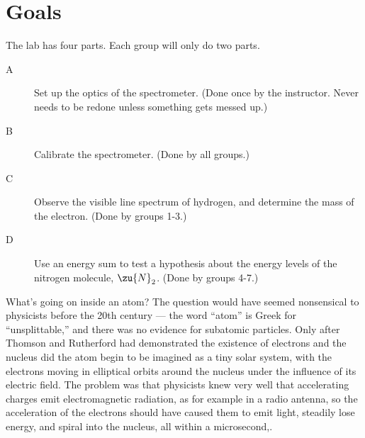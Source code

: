 \label{lab:hydrogen}

\apparatus
{}

\section*{Goals}

The lab has four parts. Each group will only do two parts.

\begin{description}

\item[A] Set up the optics of the spectrometer. (Done once by the instructor. Never needs to be redone unless
           something gets messed up.)

\item[B] Calibrate the spectrometer. (Done by all groups.)

\item[C] Observe the visible line spectrum of hydrogen, and determine the mass of the electron.
             (Done by groups 1-3.)

\item[D] Use an energy sum to test a hypothesis about the energy levels of the nitrogen molecule, $\zu{N}_2$.
             (Done by groups 4-7.)
\end{description}

\introduction

What's going on inside an atom? The question would have
seemed nonsensical to physicists before the 20th century ---
the word ``atom'' is Greek for ``unsplittable,'' and there
was no evidence for subatomic particles. Only after Thomson
and Rutherford had demonstrated the existence of electrons
and the nucleus did the atom begin to be imagined as a tiny
solar system, with the electrons moving in elliptical orbits
around the nucleus under the influence of its electric
field. The problem was that physicists knew very well that
accelerating charges emit electromagnetic radiation, as for
example in a radio antenna, so the acceleration of the
electrons should have caused them to emit light, steadily
lose energy, and spiral into the nucleus, all within a microsecond,.

